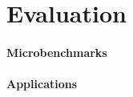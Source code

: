 \section{Evaluation}
\label{sec:evaluation}


\paragraph{Microbenchmarks}



\paragraph{Applications}







